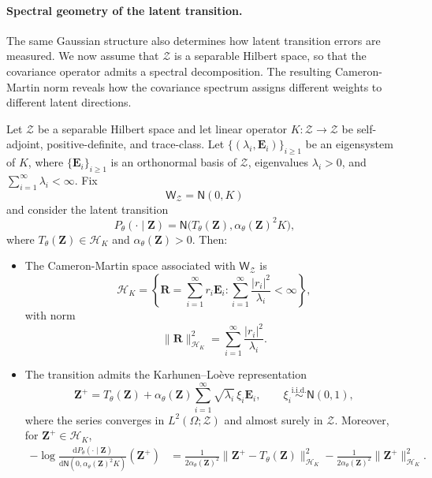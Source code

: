 \documentclass[11pt]{article}
\renewcommand{\d}{\mathrm{d}}
\begin{document}
\paragraph{Spectral geometry of the latent transition.}
The same Gaussian structure also determines how latent transition errors are measured. We now assume that $\mathcal Z$ is a separable Hilbert space, so that the covariance operator admits a spectral decomposition. The resulting Cameron-Martin norm reveals how the covariance spectrum assigns different weights to different latent directions.

\begin{proposition}
\label{prop:general_spectral_residual_control}
Let $\mathcal Z$ be a separable Hilbert space and let linear operator $K:\mathcal Z\to\mathcal Z$ be self-adjoint, positive-definite, and trace-class. Let $\{(\lambda_i,\mathbf E_i)\}_{i\geq1}$ be an eigensystem of $K$, where
$\{\mathbf E_i\}_{i\geq1}$ is an orthonormal basis of $\mathcal Z$, eigenvalues $\lambda_i>0$, and $\sum_{i=1}^{\infty}\lambda_i<\infty$. Fix
\[
    \mathsf W_{\mathcal Z}
    =
    \mathsf N(0,K)
\]
and consider the latent transition
\[
    P_\theta(\cdot\mid\mathbf Z)
    =
    \mathsf N
    \bigl(
        T_\theta(\mathbf Z),
        \alpha_\theta(\mathbf Z)^2K
    \bigr),
\]
where $T_\theta(\mathbf Z)\in\mathcal H_K$ and
$\alpha_\theta(\mathbf Z)>0$. Then:

\begin{itemize}[topsep=0pt,itemsep=2pt]
\item[(a)]
The Cameron-Martin space associated with $\mathsf W_{\mathcal Z}$ is
\[
    \mathcal H_K
    =
    \left\{
        \mathbf R=\sum_{i=1}^{\infty}r_i\mathbf E_i:
        \sum_{i=1}^{\infty}\frac{|r_i|^2}{\lambda_i}<\infty
    \right\},
\]
with norm
\begin{equation}
    \|\mathbf R\|_{\mathcal H_K}^2
    =
    \sum_{i=1}^{\infty}
    \frac{|r_i|^2}{\lambda_i}.
    \label{eq:cm_spectral_norm}
\end{equation}
\item[(b)]
The transition admits the Karhunen--Lo\`eve representation
\begin{equation}
    \mathbf Z^+
    =
    T_\theta(\mathbf Z)
    +
    \alpha_\theta(\mathbf Z)
    \sum_{i=1}^{\infty}
        \sqrt{\lambda_i}\,\xi_i\mathbf E_i,
    \qquad
    \xi_i\overset{\mathrm{i.i.d.}}{\sim}\mathsf N(0,1),
    \label{eq:transition_kl_expansion}
\end{equation}
where the series converges in $L^2(\Omega;\mathcal Z)$ and almost surely in $\mathcal Z$. Moreover, for $\mathbf Z^+\in\mathcal H_K$,
\begin{equation}
\begin{aligned}
    -\log\frac{\d P_\theta(\cdot\mid\mathbf Z)}{\d\mathsf N(0,\alpha_\theta(\mathbf Z)^2K)}(\mathbf Z^+)
    &=\frac{1}{2\alpha_\theta(\mathbf Z)^2}\|\mathbf Z^+ -T_\theta(\mathbf Z)\|_{\mathcal H_K}^2 -\frac{1}{2\alpha_\theta(\mathbf Z)^2}\|\mathbf Z^+\|_{\mathcal H_K}^2 .
\end{aligned}
\label{eq:transition_cm_density}
\end{equation}
\end{itemize}
\end{proposition}
\end{document}
